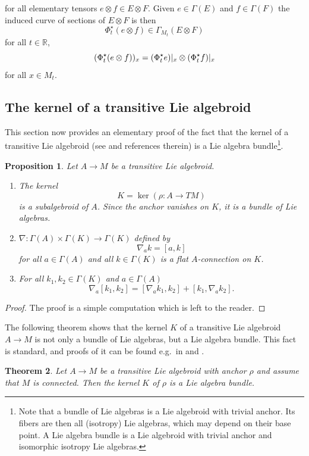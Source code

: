 \documentclass{amsart}
\theoremstyle{plain}
\newtheorem{theorem}{Theorem}[section]
\newtheorem{proposition}[theorem]{Proposition}
\newcommand{\an}[1]{\arrowvert_{#1}}
\begin{document}
for all elementary tensors $e\otimes f\in E\otimes F$.
Given $e\in\Gamma(E)$ and $f\in\Gamma(F)$ the 
induced curve of sections of $E\otimes F$ is then 
\[
\Phi_t^\star(e\otimes f)\in\Gamma_{M_t}(E\otimes F)
\]
for all $t\in\mathbb R$, 
\[ (\Phi_t^\star(e\otimes f))_x=(\Phi_t^\star e)\an{x}\otimes (\Phi_t^\star f)\an{x}
\]
for all $x\in M_t$.


\subsection{The kernel of a transitive Lie algebroid}
This section now provides an elementary proof of the fact that the kernel of a transitive Lie algebroid (see \cite{Mackenzie05} and references therein) is a Lie algebra bundle\footnote{Note that a bundle of Lie algebras is a Lie algebroid with trivial anchor. Its fibers are then all (isotropy) Lie algebras, which may depend on their base point. A Lie algebra bundle is a Lie algebroid with trivial anchor and isomorphic isotropy Lie algebras.}. 


\begin{proposition}\label{prop_K}
Let $A\to M$ be a transitive Lie algebroid.
\begin{enumerate}
\item  The kernel 
\[ K=\ker(\rho\colon A\to TM)
\]
is a subalgebroid of $A$. Since the anchor vanishes on $K$, it is a bundle of Lie algebras.
\item $\nabla\colon\Gamma(A)\times\Gamma(K)\to \Gamma(K)$ 
defined by 
\[ \nabla_ak=[a,k]
\]
for all $a\in\Gamma(A)$ and all $k\in\Gamma(K)$ is a flat $A$-connection on $K$.
\item For all $k_1,k_2\in\Gamma(K)$ and $a\in\Gamma(A)$
\[
\nabla_a[k_1,k_2]=[\nabla_ak_1, k_2]+[k_1,\nabla_ak_2].
\]
\end{enumerate}
\end{proposition}
\begin{proof}
The proof is a simple computation which is left to the reader.
\end{proof}

The following theorem shows that the kernel $K$ of a transitive Lie algebroid $A\to M$ is not only a bundle of Lie algebras, but a Lie algebra bundle. This fact is standard, and proofs of it can be found e.g.~in \cite{Mackenzie05} and \cite{Meinrenken21}.
\begin{theorem}\label{kernel_lab}
Let $A\to M$ be a transitive Lie algebroid with anchor $\rho$ and assume that $M$ is connected. Then the kernel $K$ of $\rho$ is a Lie algebra bundle.
\end{theorem}
\end{document}
